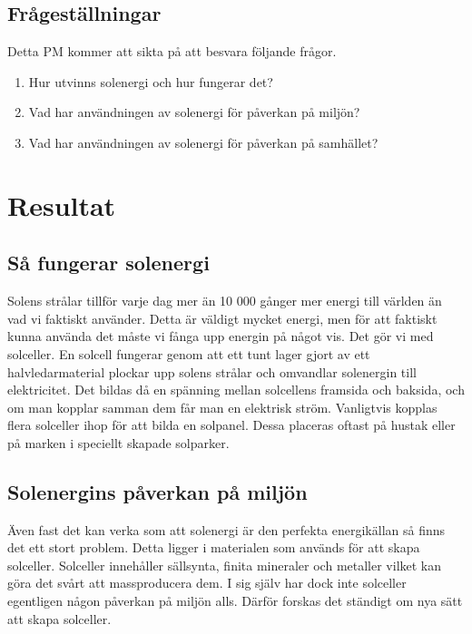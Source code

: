 \documentclass[11p]{article}
\begin{document}
    \subsection{Frågeställningar}
    Detta PM kommer att sikta på att besvara följande frågor.
    \begin{enumerate}
        \item Hur utvinns solenergi och hur fungerar det?
        \item Vad har användningen av solenergi för påverkan på miljön?
        \item Vad har användningen av solenergi för påverkan på samhället?
    \end{enumerate}

    \section{Resultat}
    \subsection{Så fungerar solenergi}
    Solens strålar tillför varje dag mer än 10 000 gånger mer energi till världen än vad vi faktiskt använder.
    Detta är väldigt mycket energi, men för att faktiskt kunna använda det måste vi fånga upp energin på något vis.
    Det gör vi med solceller. \parencite{Naturskyddsforeningen}
    \newline En solcell fungerar genom att ett tunt lager gjort av ett halvledarmaterial plockar upp solens strålar och omvandlar solenergin till elektricitet.
    Det bildas då en spänning mellan solcellens framsida och baksida, och om man kopplar samman dem får man en elektrisk ström. \parencite{Naturskyddsforeningen}
    \newline Vanligtvis kopplas flera solceller ihop för att bilda en solpanel.
    Dessa placeras oftast på hustak eller på marken i speciellt skapade solparker.
    \subsection{Solenergins påverkan på miljön}
    Även fast det kan verka som att solenergi är den perfekta energikällan så finns det ett stort problem.
    Detta ligger i materialen som används för att skapa solceller.
    Solceller innehåller sällsynta, finita mineraler och metaller vilket kan göra det svårt att massproducera dem. \parencite{Naturskyddsforeningen}
    \newline I sig själv har dock inte solceller egentligen någon påverkan på miljön alls.
    Därför forskas det ständigt om nya sätt att skapa solceller. \parencite{Naturskyddsforeningen}
\end{document}
